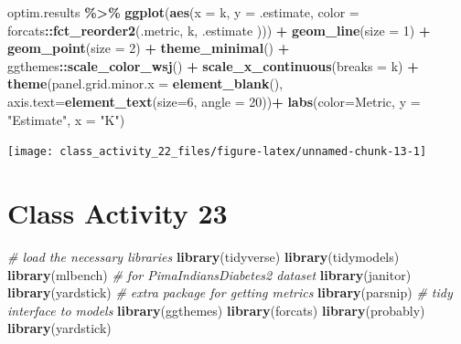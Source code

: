 \documentclass[
]{book}
\newenvironment{Shaded}{\begin{snugshade}}{\end{snugshade}}
\newcommand{\AttributeTok}[1]{\textcolor[rgb]{0.13,0.29,0.53}{#1}}
\newcommand{\CommentTok}[1]{\textcolor[rgb]{0.56,0.35,0.01}{\textit{#1}}}
\newcommand{\DecValTok}[1]{\textcolor[rgb]{0.00,0.00,0.81}{#1}}
\newcommand{\FunctionTok}[1]{\textcolor[rgb]{0.13,0.29,0.53}{\textbf{#1}}}
\newcommand{\NormalTok}[1]{#1}
\newcommand{\SpecialCharTok}[1]{\textcolor[rgb]{0.81,0.36,0.00}{\textbf{#1}}}
\newcommand{\StringTok}[1]{\textcolor[rgb]{0.31,0.60,0.02}{#1}}
\begin{document}
\begin{Shaded}
\begin{Highlighting}[]
\NormalTok{optim.results }\SpecialCharTok{\%\textgreater{}\%}
  \FunctionTok{ggplot}\NormalTok{(}\FunctionTok{aes}\NormalTok{(}\AttributeTok{x =}\NormalTok{ k, }\AttributeTok{y =}\NormalTok{ .estimate, }\AttributeTok{color =}\NormalTok{ forcats}\SpecialCharTok{::}\FunctionTok{fct\_reorder2}\NormalTok{(.metric, k, .estimate ))) }\SpecialCharTok{+}
  \FunctionTok{geom\_line}\NormalTok{(}\AttributeTok{size =} \DecValTok{1}\NormalTok{) }\SpecialCharTok{+}
  \FunctionTok{geom\_point}\NormalTok{(}\AttributeTok{size =} \DecValTok{2}\NormalTok{) }\SpecialCharTok{+}
  \FunctionTok{theme\_minimal}\NormalTok{() }\SpecialCharTok{+}
\NormalTok{  ggthemes}\SpecialCharTok{::}\FunctionTok{scale\_color\_wsj}\NormalTok{() }\SpecialCharTok{+} 
  \FunctionTok{scale\_x\_continuous}\NormalTok{(}\AttributeTok{breaks =}\NormalTok{ k) }\SpecialCharTok{+}
  \FunctionTok{theme}\NormalTok{(}\AttributeTok{panel.grid.minor.x =} \FunctionTok{element\_blank}\NormalTok{(),}
        \AttributeTok{axis.text=}\FunctionTok{element\_text}\NormalTok{(}\AttributeTok{size=}\DecValTok{6}\NormalTok{, }\AttributeTok{angle =} \DecValTok{20}\NormalTok{))}\SpecialCharTok{+}
  \FunctionTok{labs}\NormalTok{(}\AttributeTok{color=}\StringTok{\textquotesingle{}Metric\textquotesingle{}}\NormalTok{, }\AttributeTok{y =} \StringTok{"Estimate"}\NormalTok{, }\AttributeTok{x =} \StringTok{"K"}\NormalTok{) }
\end{Highlighting}
\end{Shaded}

\texttt{[image: class\_activity\_22\_files/figure-latex/unnamed-chunk-13-1]}

\hypertarget{class-activity-23}{%
\chapter{Class Activity 23}\label{class-activity-23}}

\begin{Shaded}
\begin{Highlighting}[]
\CommentTok{\# load the necessary libraries}
\FunctionTok{library}\NormalTok{(tidyverse) }
\FunctionTok{library}\NormalTok{(tidymodels)}
\FunctionTok{library}\NormalTok{(mlbench)     }\CommentTok{\# for PimaIndiansDiabetes2 dataset}
\FunctionTok{library}\NormalTok{(janitor)}
\FunctionTok{library}\NormalTok{(yardstick) }\CommentTok{\# extra package for getting metrics}
\FunctionTok{library}\NormalTok{(parsnip) }\CommentTok{\# tidy interface to models}
\FunctionTok{library}\NormalTok{(ggthemes)}
\FunctionTok{library}\NormalTok{(forcats)}
\FunctionTok{library}\NormalTok{(probably)}
\FunctionTok{library}\NormalTok{(yardstick)}
\end{Highlighting}
\end{Shaded}
\end{document}
